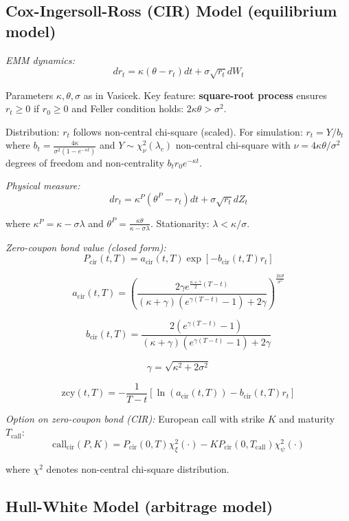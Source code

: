 \documentclass[12pt,a4paper]{article}
\begin{document}
\subsection{Cox-Ingersoll-Ross (CIR) Model (equilibrium model)}

\textit{EMM dynamics:}
$$dr_t = \kappa(\theta - r_t)dt + \sigma\sqrt{r_t}dW_t$$

Parameters $\kappa, \theta, \sigma$ as in Vasicek. Key feature: \textbf{square-root process} ensures $r_t \geq 0$ if $r_0 \geq 0$ and Feller condition holds: $2\kappa\theta > \sigma^2$.

Distribution: $r_t$ follows non-central chi-square (scaled). For simulation: $r_t = Y/b_t$ where $b_t = \frac{4\kappa}{\sigma^2(1-e^{-\kappa t})}$ and $Y \sim \chi^2_{\nu}(\lambda_c)$ non-central chi-square with $\nu = 4\kappa\theta/\sigma^2$ degrees of freedom and non-centrality $b_t r_0 e^{-\kappa t}$.

\textit{Physical measure:} 
$$dr_t = \kappa^P(\theta^P - r_t)dt + \sigma\sqrt{r_t}dZ_t$$

where $\kappa^P = \kappa - \sigma\lambda$ and $\theta^P = \frac{\kappa\theta}{\kappa - \sigma\lambda}$. Stationarity: $\lambda < \kappa/\sigma$.

\textit{Zero-coupon bond value (closed form):}
$$P_{\text{cir}}(t,T) = a_{\text{cir}}(t,T)\exp[-b_{\text{cir}}(t,T)r_t]$$

$$a_{\text{cir}}(t,T) = \left(\frac{2\gamma e^{\frac{\kappa + \gamma}{2}(T-t)}}{(\kappa + \gamma)(e^{\gamma(T-t)} - 1) + 2\gamma}\right)^{\frac{2\kappa\theta}{\sigma^2}}$$

$$b_{\text{cir}}(t,T) = \frac{2(e^{\gamma(T-t)} - 1)}{(\kappa + \gamma)(e^{\gamma(T-t)} - 1) + 2\gamma}$$

$$\gamma = \sqrt{\kappa^2 + 2\sigma^2}$$

$$\text{zcy}(t,T) = -\frac{1}{T-t}[\ln(a_{\text{cir}}(t,T)) - b_{\text{cir}}(t,T)r_t]$$

\textit{Option on zero-coupon bond (CIR):} European call with strike $K$ and maturity $T_{\text{call}}$:
$$\text{call}_{\text{cir}}(P,K) = P_{\text{cir}}(0,T)\chi^2_\xi(\cdot) - KP_{\text{cir}}(0,T_{\text{call}})\chi^2_\psi(\cdot)$$

where $\chi^2$ denotes non-central chi-square distribution.

\subsection{Hull-White Model (arbitrage model)}
\end{document}
